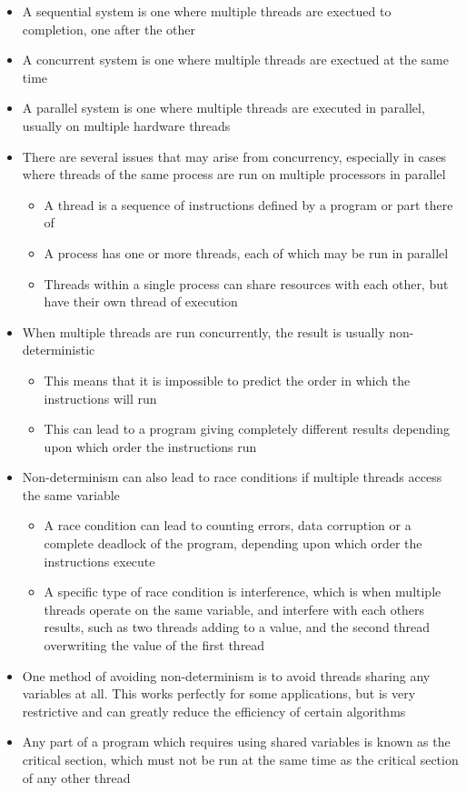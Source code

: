 
\begin{itemize}
  \item A sequential system is one where multiple threads are exectued to completion, one after the other
  \item A concurrent system is one where multiple threads are exectued at the same time
  \item A parallel system is one where multiple threads are executed in parallel, usually on multiple hardware threads
\end{itemize}

\begin{itemize}
  \item There are several issues that may arise from concurrency, especially in cases where threads of the same process are run on multiple processors in parallel
  \begin{itemize}
    \item A thread is a sequence of instructions defined by a program or part there of
    \item A process has one or more threads, each of which may be run in parallel
    \item Threads within a single process can share resources with each other, but have their own thread of execution
  \end{itemize}
  \item When multiple threads are run concurrently, the result is usually non-deterministic
  \begin{itemize}
    \item This means that it is impossible to predict the order in which the instructions will run
    \item This can lead to a program giving completely different results depending upon which order the instructions run
  \end{itemize}
  \item Non-determinism can also lead to race conditions if multiple threads access the same variable
  \begin{itemize}
    \item A race condition can lead to counting errors, data corruption or a complete deadlock of the program, depending upon which order the instructions execute
    \item A specific type of race condition is interference, which is when multiple threads operate on the same variable, and interfere with each others results, such as two threads adding to a value, and the second thread overwriting the value of the first thread
  \end{itemize}
  \item One method of avoiding non-determinism is to avoid threads sharing any variables at all. This works perfectly for some applications, but is very restrictive and can greatly reduce the efficiency of certain algorithms
  \item Any part of a program which requires using shared variables is known as the critical section, which must not be run at the same time as the critical section of any other thread
\end{itemize}